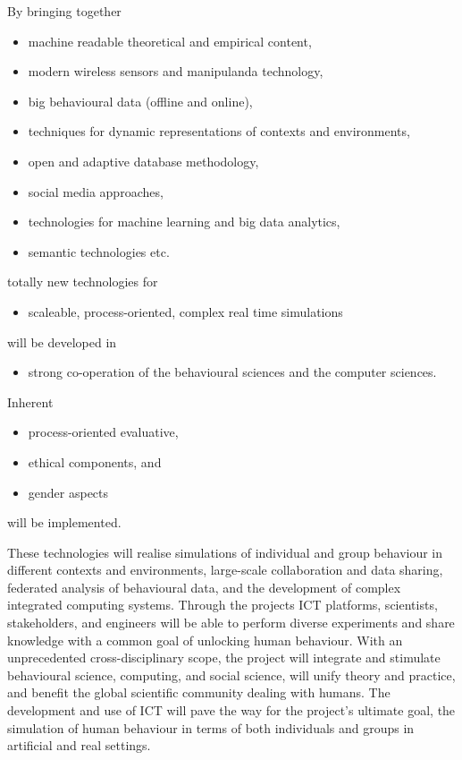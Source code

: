 \documentclass[a4paper,UKenglish]{dagrep}
\begin{document}
By bringing together
\begin{itemize}
\item machine readable theoretical and empirical content,
\item modern wireless sensors and manipulanda technology,
\item big behavioural data (offline and online),
\item techniques for dynamic representations of contexts and environments,
\item open and adaptive database methodology,
\item social media approaches,
\item technologies for machine learning and big data analytics,
\item semantic technologies etc.
\end{itemize}
totally new technologies for
\begin{itemize}
\item scaleable, process-oriented, complex real time simulations
\end{itemize}
will be developed in
\begin{itemize}
\item strong co-operation of the behavioural sciences and the computer sciences.
\end{itemize}
Inherent
\begin{itemize}
\item process-oriented evaluative,
\item ethical components, and
\item gender aspects
\end{itemize}
will be implemented.

These technologies will realise simulations of individual and group behaviour in
different contexts and environments, large-scale collaboration and data sharing,
federated analysis of behavioural data, and the development of complex
integrated computing systems. Through the projects ICT platforms, scientists,
stakeholders, and engineers will be able to perform diverse experiments and
share knowledge with a common goal of unlocking human behaviour. With an
unprecedented cross-disciplinary scope, the project will integrate and stimulate
behavioural science, computing, and social science, will unify theory and
practice, and benefit the global scientific community dealing with humans. The
development and use of ICT will pave the way for the project's ultimate goal,
the simulation of human behaviour in terms of both individuals and groups in
artificial and real settings. 
\end{document}
